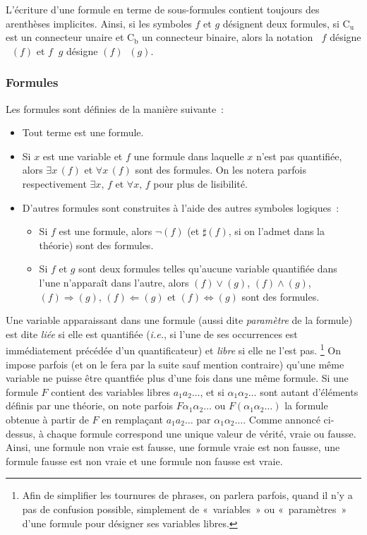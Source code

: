 L'écriture d'une formule en terme de sous-formules contient toujours des arenthèses implicites. 
Ainsi, si les symboles $f$ et $g$ désignent deux formules, si $\mathrm{C_u}$ est un connecteur unaire et $\mathrm{C_b}$ un connecteur binaire, alors la notation $\mathop{\mathrm{C_u}} f$ désigne $\mathop{\mathrm{C_u}} (f)$ et $f \mathop{\mathrm{C_b}} g$ désigne $(f) \mathop{\mathrm{C_b}} (g)$.

\subsubsection{Formules}

Les formules sont définies de la manière suivante : 
\begin{itemize}
    \item Tout terme est une formule. 
    \item Si $x$ est une variable et $f$ une formule dans laquelle $x$ n'est pas quantifiée, alors $\exists x \, (f)$ et $\forall x \, (f)$ sont des formules. 
        On les notera parfois respectivement $\exists x, \, f$ et $\forall x, \, f$ pour plus de lisibilité.
    \item D'autres formules sont construites à l'aide des autres symboles logiques : 
    \begin{itemize}
        \item Si $f$ est une formule, alors $\neg (f)$ (et $\sharp (f)$, si on l'admet dans la théorie) sont des formules.
        \item Si $f$ et $g$ sont deux formules telles qu'aucune variable quantifiée dans l'une n'apparaît dans l'autre, alors $(f) \vee (g)$, $(f) \wedge (g)$, $(f) \Rightarrow (g)$, $(f) \Leftarrow (g)$ et $(f) \Leftrightarrow (g)$ sont des formules.
    \end{itemize}
\end{itemize}

Une variable apparaissant dans une formule (aussi dite \textit{paramètre} de la formule) est dite \textit{liée} si elle est quantifiée (\textit{i.e.}, si l'une de ses occurrences est immédiatement précédée d'un quantificateur) et \textit{libre} si elle ne l'est pas.%
\footnote{
    Afin de simplifier les tournures de phrases, on parlera parfois, quand il n'y a pas de confusion possible, simplement de « variables » ou « paramètres » d'une formule pour désigner ses variables libres. 
}
On impose parfois (et on le fera par la suite sauf mention contraire) qu'une même variable ne puisse être quantfiée plus d'une fois dans une même formule.
Si une formule $F$ contient des variables libres $a_1 a_2 \dots$, et si $\alpha_1 \alpha_2 \dots$ sont autant d'éléments définis par une théorie, on note parfois $F \alpha_1 \alpha_2 \dots$ ou $F (\alpha_1 \alpha_2 \dots)$ la formule obtenue à partir de $F$ en remplaçant $a_1 a_2 \dots$ par $\alpha_1 \alpha_2 \dots$.
Comme annoncé ci-dessus, à chaque formule correspond une unique valeur de vérité, vraie ou fausse. 
Ainsi, une formule non vraie est fausse, une formule vraie est non fausse, une formule fausse est non vraie et une formule non fausse est vraie.

